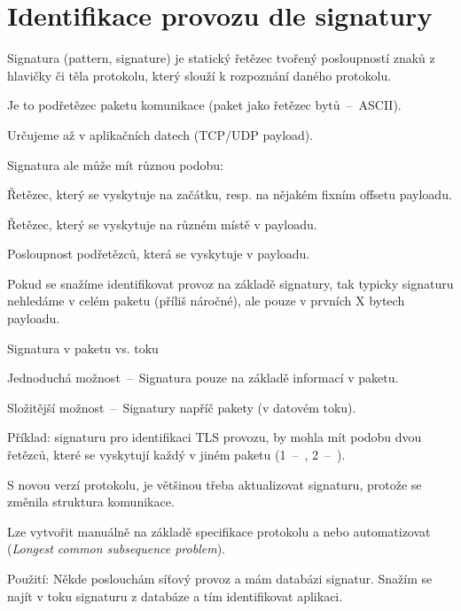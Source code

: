 
\section{Identifikace provozu dle signatury}


\begin{compactitem}
    \item Signatura (pattern, signature) je statický řetězec tvořený posloupností znaků z hlavičky či těla protokolu, který slouží k rozpoznání daného protokolu. \begin{compactitem}
        \item Je to  podřetězec paketu komunikace (paket jako řetězec bytů~--~ASCII).
        \item Určujeme až v aplikačních datech (TCP/UDP payload).
    \end{compactitem}
    \item Signatura ale může mít různou podobu: \begin{compactitem}
        \item Řetězec, který se vyskytuje na začátku, resp. na nějakém fixním offsetu payloadu.
        \item Řetězec, který se vyskytuje na různém místě v payloadu.
        \item Posloupnost podřetězců, která se vyskytuje v payloadu.
    \end{compactitem}
    \item Pokud se snažíme identifikovat provoz na základě signatury, tak typicky signaturu nehledáme v celém paketu (příliš náročné), ale pouze v prvních X bytech payloadu.
    \item Signatura v paketu vs. toku \begin{compactitem}
        \item Jednoduchá možnost~--~Signatura pouze na základě informací v paketu.
        \item Složitější možnost~--~Signatury napříč pakety (v datovém toku). \begin{compactitem}
            \item Příklad: signaturu pro identifikaci TLS provozu, by mohla mít podobu dvou řetězců, které se vyskytují každý v jiném paketu (1~--~, 2~--~).
        \end{compactitem}
    \end{compactitem}
    \item S novou verzí protokolu, je většinou třeba aktualizovat signaturu, protože se změnila struktura komunikace.
    \item Lze vytvořit manuálně na základě specifikace protokolu a nebo automatizovat (\textit{Longest common subsequence problem}).
    \item Použití: Někde poslouchám síťový provoz a mám databázi signatur. Snažím se najít v toku signaturu z databáze a tím identifikovat aplikaci.
\end{compactitem}


